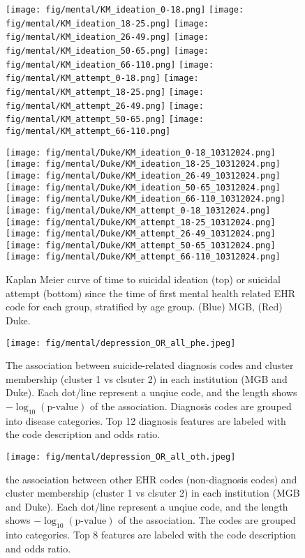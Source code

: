 \documentclass{article}
\begin{document}
\begin{figure}[H]
    \centering
    \texttt{[image: fig/mental/KM\_ideation\_0-18.png]}
    \texttt{[image: fig/mental/KM\_ideation\_18-25.png]}
    \texttt{[image: fig/mental/KM\_ideation\_26-49.png]}
    \texttt{[image: fig/mental/KM\_ideation\_50-65.png]}
    \texttt{[image: fig/mental/KM\_ideation\_66-110.png]}
    \texttt{[image: fig/mental/KM\_attempt\_0-18.png]}
    \texttt{[image: fig/mental/KM\_attempt\_18-25.png]}
    \texttt{[image: fig/mental/KM\_attempt\_26-49.png]}
    \texttt{[image: fig/mental/KM\_attempt\_50-65.png]}
    \texttt{[image: fig/mental/KM\_attempt\_66-110.png]}
    
    \texttt{[image: fig/mental/Duke/KM\_ideation\_0-18\_10312024.png]}
    \texttt{[image: fig/mental/Duke/KM\_ideation\_18-25\_10312024.png]}
    \texttt{[image: fig/mental/Duke/KM\_ideation\_26-49\_10312024.png]}
    \texttt{[image: fig/mental/Duke/KM\_ideation\_50-65\_10312024.png]}
    \texttt{[image: fig/mental/Duke/KM\_ideation\_66-110\_10312024.png]}
    \texttt{[image: fig/mental/Duke/KM\_attempt\_0-18\_10312024.png]}
    \texttt{[image: fig/mental/Duke/KM\_attempt\_18-25\_10312024.png]}
    \texttt{[image: fig/mental/Duke/KM\_attempt\_26-49\_10312024.png]}
    \texttt{[image: fig/mental/Duke/KM\_attempt\_50-65\_10312024.png]}
    \texttt{[image: fig/mental/Duke/KM\_attempt\_66-110\_10312024.png]}
    \caption{Kaplan Meier curve of time to suicidal ideation (top) or suicidal attempt (bottom) since the time of first mental health related EHR code for each group, stratified by age group. (Blue) MGB, (Red) Duke.}
    \label{fig:KM_rpdr}
\end{figure}

\begin{figure}[H]
    \centering
    \texttt{[image: fig/mental/depression\_OR\_all\_phe.jpeg]}
    \caption{The association between suicide-related diagnosis codes and cluster membership (cluster 1 vs clsuter 2) in each institution (MGB and Duke). Each dot/line represent a unqiue code, and the length shows $-\log_{10}(\text{p-value})$ of the association. Diagnosis codes are grouped into disease categories. Top 12 diagnosis features are labeled with the code description and odds ratio.}
    \label{fig:suicide_phewas_phe}
\end{figure}

\begin{figure}[H]
    \centering
    \texttt{[image: fig/mental/depression\_OR\_all\_oth.jpeg]}
    \caption{the association between other EHR codes (non-diagnosis codes) and cluster membership (cluster 1 vs clsuter 2) in each institution (MGB and Duke). Each dot/line represent a unqiue code, and the length shows $-\log_{10}(\text{p-value})$ of the association. The codes are grouped into categories. Top 8 features are labeled with the code description and odds ratio.}
    \label{fig:suicide_phewas_oth}
\end{figure}
\end{document}
